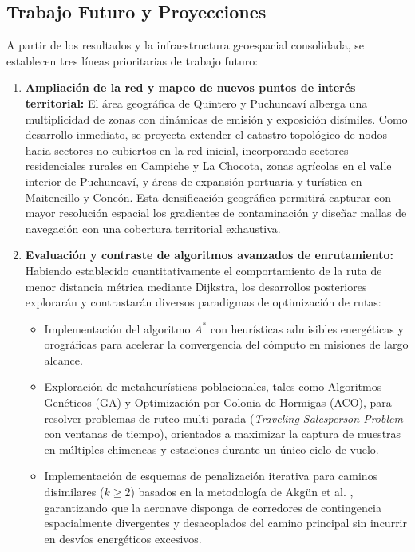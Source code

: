 \documentclass[letterpaper,12pt]{article}
\begin{document}
\subsection{Trabajo Futuro y Proyecciones}
\label{subsec:trabajo_futuro}

A partir de los resultados y la infraestructura geoespacial consolidada, se establecen tres líneas prioritarias de trabajo futuro:

\begin{enumerate}
    \item \textbf{Ampliación de la red y mapeo de nuevos puntos de interés territorial:}
    El área geográfica de Quintero y Puchuncaví alberga una multiplicidad de zonas con dinámicas de emisión y exposición disímiles. Como desarrollo inmediato, se proyecta extender el catastro topológico de nodos hacia sectores no cubiertos en la red inicial, incorporando sectores residenciales rurales en Campiche y La Chocota, zonas agrícolas en el valle interior de Puchuncaví, y áreas de expansión portuaria y turística en Maitencillo y Concón. Esta densificación geográfica permitirá capturar con mayor resolución espacial los gradientes de contaminación y diseñar mallas de navegación con una cobertura territorial exhaustiva.

    \item \textbf{Evaluación y contraste de algoritmos avanzados de enrutamiento:}
    Habiendo establecido cuantitativamente el comportamiento de la ruta de menor distancia métrica mediante Dijkstra, los desarrollos posteriores explorarán y contrastarán diversos paradigmas de optimización de rutas:
    \begin{itemize}
        \item Implementación del algoritmo $A^*$ con heurísticas admisibles energéticas y orográficas para acelerar la convergencia del cómputo en misiones de largo alcance.
        \item Exploración de metaheurísticas poblacionales, tales como Algoritmos Genéticos (GA) y Optimización por Colonia de Hormigas (ACO), para resolver problemas de ruteo multi-parada (\textit{Traveling Salesperson Problem} con ventanas de tiempo), orientados a maximizar la captura de muestras en múltiples chimeneas y estaciones durante un único ciclo de vuelo.
        \item Implementación de esquemas de penalización iterativa para caminos disimilares ($k \ge 2$) basados en la metodología de Akgün et al. \cite{akgun}, garantizando que la aeronave disponga de corredores de contingencia espacialmente divergentes y desacoplados del camino principal sin incurrir en desvíos energéticos excesivos.
    \end{itemize}


\end{enumerate}
\end{document}
